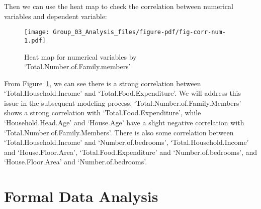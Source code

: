 \documentclass[
]{article}
\newenvironment{Shaded}{\begin{snugshade}}{\end{snugshade}}
\newcommand{\AttributeTok}[1]{\textcolor[rgb]{0.40,0.45,0.13}{#1}}
\newcommand{\CommentTok}[1]{\textcolor[rgb]{0.37,0.37,0.37}{#1}}
\newcommand{\ConstantTok}[1]{\textcolor[rgb]{0.56,0.35,0.01}{#1}}
\newcommand{\DecValTok}[1]{\textcolor[rgb]{0.68,0.00,0.00}{#1}}
\newcommand{\FunctionTok}[1]{\textcolor[rgb]{0.28,0.35,0.67}{#1}}
\newcommand{\NormalTok}[1]{\textcolor[rgb]{0.00,0.23,0.31}{#1}}
\newcommand{\OtherTok}[1]{\textcolor[rgb]{0.00,0.23,0.31}{#1}}
\newcommand{\SpecialCharTok}[1]{\textcolor[rgb]{0.37,0.37,0.37}{#1}}
\newcommand{\StringTok}[1]{\textcolor[rgb]{0.13,0.47,0.30}{#1}}
\begin{document}
\begin{Shaded}
\end{Shaded}

Then we can use the heat map to check the correlation between numerical
variables and dependent variable:

\begin{figure}[H]

{\centering \texttt{[image: Group\_03\_Analysis\_files/figure-pdf/fig-corr-num-1.pdf]}

}

\caption{\label{fig-corr-num}Heat map for numerical variables by
`Total.Number.of.Family.members'}

\end{figure}

From Figure~\ref{fig-corr-num}, we can see there is a strong correlation
between `Total.Household.Income' and `Total.Food.Expenditure'. We will
address this issue in the subsequent modeling process.
`Total.Number.of.Family.Members' shows a strong correlation with
`Total.Food.Expenditure', while `Household.Head.Age' and `House.Age'
have a slight negative correlation with
`Total.Number.of.Family.Members'. There is also some correlation between
`Total.Household.Income' and `Number.of.bedrooms',
`Total.Household.Income' and `House.Floor.Area',
`Total.Food.Expenditure' and `Number.of.bedrooms', and
`House.Floor.Area' and `Number.of.bedrooms'.

\hypertarget{formal-data-analysis}{%
\section{Formal Data Analysis}\label{formal-data-analysis}}
\end{document}
